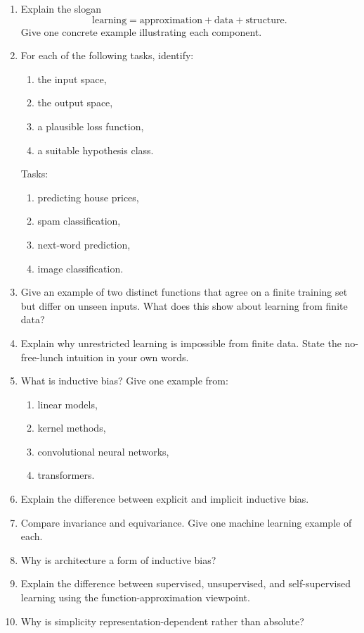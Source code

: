 \begin{enumerate}
    \item Explain the slogan
    \[
    \text{learning} = \text{approximation} + \text{data} + \text{structure}.
    \]
    Give one concrete example illustrating each component.

    \item For each of the following tasks, identify:
    \begin{enumerate}
        \item the input space,
        \item the output space,
        \item a plausible loss function,
        \item a suitable hypothesis class.
    \end{enumerate}
    Tasks:
    \begin{enumerate}
        \item predicting house prices,
        \item spam classification,
        \item next-word prediction,
        \item image classification.
    \end{enumerate}

    \item Give an example of two distinct functions that agree on a finite training set but differ on unseen inputs. What does this show about learning from finite data?

    \item Explain why unrestricted learning is impossible from finite data. State the no-free-lunch intuition in your own words.

    \item What is inductive bias? Give one example from:
    \begin{enumerate}
        \item linear models,
        \item kernel methods,
        \item convolutional neural networks,
        \item transformers.
    \end{enumerate}

    \item Explain the difference between explicit and implicit inductive bias.

    \item Compare invariance and equivariance. Give one machine learning example of each.

    \item Why is architecture a form of inductive bias?

    \item Explain the difference between supervised, unsupervised, and self-supervised learning using the function-approximation viewpoint.

    \item Why is simplicity representation-dependent rather than absolute?
\end{enumerate}

